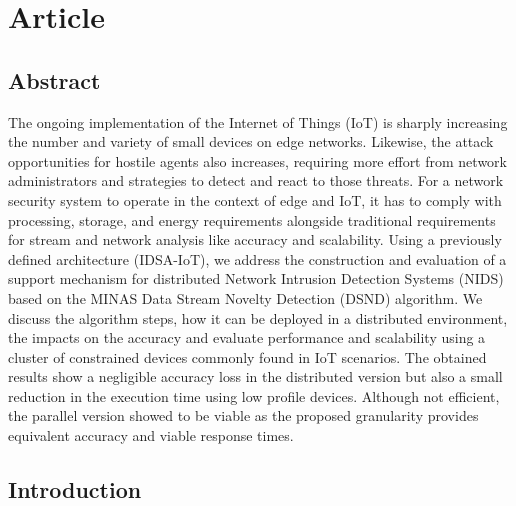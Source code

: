 \renewcommand{\iot}{IoT\xspace}
\newcommand{\arch}{IDSA-IoT\xspace}
\newcommand{\nids}{NIDS\xspace}
\renewcommand{\nd}{DSND\xspace}
\newcommand{\minas}{MINAS\xspace}
\newcommand{\refminas}{\textit{Ref}\xspace}
\renewcommand{\mfog}{\textit{MFOG}\xspace}

\section{Article}

\subsection{Abstract}

The ongoing implementation of the Internet of Things (\iot) is sharply
increasing the number and variety of small devices on edge networks.
%
Likewise, the attack opportunities for hostile agents also
increases, requiring more effort from network administrators and strategies
to detect and react to those threats.
% 
For a network security system to operate in the context of edge and
\iot, it has to comply with processing, storage, and energy
requirements alongside traditional requirements for stream and network
analysis like accuracy and scalability.
% 
Using a previously defined architecture (\arch), we address the construction
and evaluation of a support mechanism for distributed Network Intrusion
Detection Systems (\nids) based on the \minas Data Stream Novelty Detection
(\nd) algorithm.
% 
We discuss the algorithm steps, how it can be deployed in a distributed
environment, the impacts on the accuracy and evaluate performance and
scalability using a cluster of constrained devices commonly found in \iot
scenarios.
% 
The obtained results show a negligible accuracy loss in the distributed
version but also a small reduction in the execution time using low profile
devices. Although not efficient, the parallel version showed to be viable as
the proposed granularity provides equivalent accuracy and viable response times.

\subsection{Introduction}

